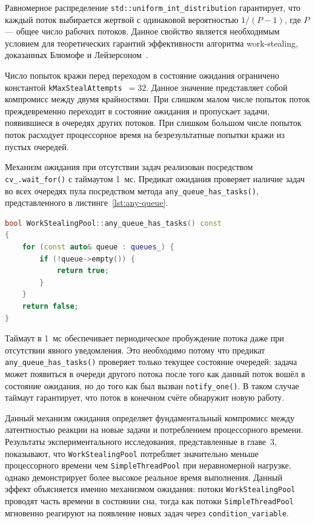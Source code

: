 Равномерное распределение \texttt{std::uniform\_int\_distribution}
гарантирует, что каждый поток выбирается жертвой с одинаковой
вероятностью $1 / (P - 1)$, где $P$ --- общее число рабочих
потоков. Данное свойство является необходимым условием для
теоретических гарантий эффективности алгоритма work-stealing,
доказанных Блюмофе и Лейзерсоном~\cite{Blumofe1999}.

Число попыток кражи перед переходом в состояние ожидания
ограничено константой \texttt{kMaxStealAttempts}~$= 32$.
Данное значение представляет собой компромисс между двумя
крайностями. При слишком малом числе попыток поток преждевременно
переходит в состояние ожидания и пропускает задачи, появившиеся
в очередях других потоков. При слишком большом числе попыток
поток расходует процессорное время на безрезультатные попытки
кражи из пустых очередей.

Механизм ожидания при отсутствии задач реализован посредством
\texttt{cv\_.wait\_for()} с таймаутом 1~мс. Предикат ожидания
проверяет наличие задач во всех очередях пула посредством
метода \texttt{any\_queue\_has\_tasks()}, представленного
в листинге~\ref{lst:any-queue}.

\begin{lstlisting}[language=C++,
                   caption={Проверка наличия задач в очередях пула},
                   label={lst:any-queue}]
bool WorkStealingPool::any_queue_has_tasks() const
{
    for (const auto& queue : queues_) {
        if (!queue->empty()) {
            return true;
        }
    }
    return false;
}
\end{lstlisting}

Таймаут в 1~мс обеспечивает периодическое пробуждение потока
даже при отсутствии явного уведомления. Это необходимо потому
что предикат \texttt{any\_queue\_has\_tasks()} проверяет только
текущее состояние очередей: задача может появиться в очереди
другого потока после того как данный поток вошёл в состояние
ожидания, но до того как был вызван \texttt{notify\_one()}.
В таком случае таймаут гарантирует, что поток в конечном счёте
обнаружит новую работу.

Данный механизм ожидания определяет фундаментальный компромисс
между латентностью реакции на новые задачи и потреблением
процессорного времени. Результаты экспериментального исследования,
представленные в главе~3, показывают, что \texttt{WorkStealingPool}
потребляет значительно меньше процессорного времени чем
\texttt{SimpleThreadPool} при неравномерной нагрузке, однако
демонстрирует более высокое реальное время выполнения. Данный
эффект объясняется именно механизмом ожидания: потоки
\texttt{WorkStealingPool} проводят часть времени в состоянии
сна, тогда как потоки \texttt{SimpleThreadPool} мгновенно
реагируют на появление новых задач через \texttt{condition\_variable}.

